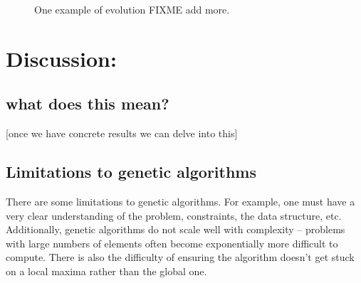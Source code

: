 \documentclass[11pt]{article}
\begin{document}
\begin{figure}
  \centering{}
  \caption{One example of evolution FIXME add more.}
  \label{fig:multi-step}
\end{figure}

\begin{figure}
\end{figure}

\section{Discussion:}
\label{sec:org7999995}
\subsection{what does this mean?}
\label{sec:orgf7b36ed}
[once we have concrete results we can delve into this]

\subsection{Limitations to genetic algorithms}
\label{sec:org148bf83}
There are some limitations to genetic algorithms. For example, one must have a very clear understanding of the problem, constraints, the data structure, etc. Additionally, genetic algorithms do not scale well with complexity -- problems with large numbers of elements often become exponentially more difficult to compute. There is also the difficulty of ensuring the algorithm doesn't get stuck on a local maxima rather than the global one.
\end{document}
